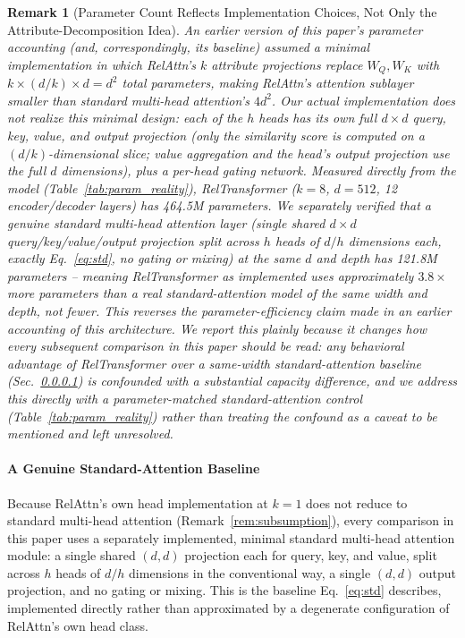 \documentclass[review]{elsarticle}
\newtheorem{remark}[theorem]{Remark}
\begin{document}
\begin{remark}[Parameter Count Reflects Implementation Choices, Not Only the Attribute-Decomposition Idea]
\label{rem:paramreality}
An earlier version of this paper's parameter accounting (and, correspondingly, its baseline) assumed a minimal implementation in which RelAttn's $k$ attribute projections replace $W_Q, W_K$ with $k \times (d/k) \times d = d^2$ total parameters, making RelAttn's attention sublayer smaller than standard multi-head attention's $4d^2$. Our actual implementation does not realize this minimal design: each of the $h$ heads has its own full $d \times d$ query, key, value, and output projection (only the similarity score is computed on a $(d/k)$-dimensional slice; value aggregation and the head's output projection use the full $d$ dimensions), plus a per-head gating network. Measured directly from the model (Table~\ref{tab:param_reality}), RelTransformer ($k{=}8$, $d{=}512$, 12 encoder/decoder layers) has 464.5M parameters. We separately verified that a \emph{genuine} standard multi-head attention layer (single shared $d \times d$ query/key/value/output projection split across $h$ heads of $d/h$ dimensions each, exactly Eq.~\eqref{eq:std}, no gating or mixing) at the same $d$ and depth has 121.8M parameters -- meaning RelTransformer as implemented uses approximately $3.8\times$ more parameters than a real standard-attention model of the same width and depth, not fewer. This reverses the parameter-efficiency claim made in an earlier accounting of this architecture. We report this plainly because it changes how every subsequent comparison in this paper should be read: any behavioral advantage of RelTransformer over a same-width standard-attention baseline (Sec.~\ref{sec:true_standard}) is confounded with a substantial capacity difference, and we address this directly with a parameter-matched standard-attention control (Table~\ref{tab:param_reality}) rather than treating the confound as a caveat to be mentioned and left unresolved.
\end{remark}

\paragraph{A Genuine Standard-Attention Baseline}
\label{sec:true_standard}
Because RelAttn's own head implementation at $k{=}1$ does not reduce to standard multi-head attention (Remark~\ref{rem:subsumption}), every comparison in this paper uses a separately implemented, minimal standard multi-head attention module: a single shared $(d,d)$ projection each for query, key, and value, split across $h$ heads of $d/h$ dimensions in the conventional way, a single $(d,d)$ output projection, and no gating or mixing. This is the baseline Eq.~\eqref{eq:std} describes, implemented directly rather than approximated by a degenerate configuration of RelAttn's own head class.
\end{document}
